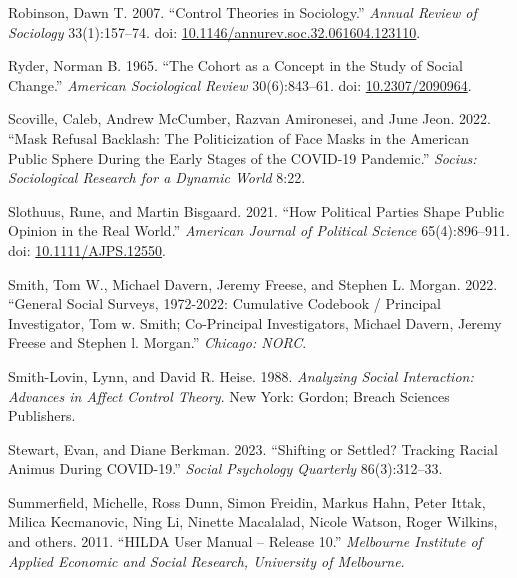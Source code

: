 \documentclass[
  12pt,
]{article}
\newlength{\cslhangindent}
\newlength{\cslentryspacingunit} %
\newenvironment{CSLReferences}[2] %
 {%
  \setlength{\parindent}{0pt}
  \ifodd #1
  \let\oldpar\par
  \def\par{\hangindent=\cslhangindent\oldpar}
  \fi
  \setlength{\parskip}{#2\cslentryspacingunit}
 }%
 {}
\begin{document}
\begin{CSLReferences}{1}{0}
\leavevmode{}%
Robinson, Dawn T. 2007. {``Control {Theories} in {Sociology}.''}
\emph{Annual Review of Sociology} 33(1):157--74. doi:
\href{https://doi.org/10.1146/annurev.soc.32.061604.123110}{10.1146/annurev.soc.32.061604.123110}.

\leavevmode{}%
Ryder, Norman B. 1965. {``The {Cohort} as a {Concept} in the {Study} of
{Social} {Change}.''} \emph{American Sociological Review} 30(6):843--61.
doi: \href{https://doi.org/10.2307/2090964}{10.2307/2090964}.

\leavevmode{}%
Scoville, Caleb, Andrew McCumber, Razvan Amironesei, and June Jeon.
2022. {``Mask {Refusal} {Backlash}: {The} {Politicization} of {Face}
{Masks} in the {American} {Public} {Sphere} During the {Early} {Stages}
of the {COVID}-19 {Pandemic}.''} \emph{Socius: Sociological Research for
a Dynamic World} 8:22.

\leavevmode{}%
Slothuus, Rune, and Martin Bisgaard. 2021. {``How {Political} {Parties}
{Shape} {Public} {Opinion} in the {Real} {World}.''} \emph{American
Journal of Political Science} 65(4):896--911. doi:
\href{https://doi.org/10.1111/AJPS.12550}{10.1111/AJPS.12550}.

\leavevmode{}%
Smith, Tom W., Michael Davern, Jeremy Freese, and Stephen L. Morgan.
2022. {``General Social Surveys, 1972-2022: Cumulative Codebook /
Principal Investigator, Tom w. Smith; Co-Principal Investigators,
Michael Davern, Jeremy Freese and Stephen l. Morgan.''} \emph{Chicago:
NORC}.

\leavevmode{}%
Smith-Lovin, Lynn, and David R. Heise. 1988. \emph{Analyzing {Social}
{Interaction}: {Advances} in {Affect} {Control} {Theory}}. New York:
Gordon; Breach Sciences Publishers.

\leavevmode{}%
Stewart, Evan, and Diane Berkman. 2023. {``Shifting or Settled? Tracking
Racial Animus During COVID-19.''} \emph{Social Psychology Quarterly}
86(3):312--33.

\leavevmode{}%
Summerfield, Michelle, Ross Dunn, Simon Freidin, Markus Hahn, Peter
Ittak, Milica Kecmanovic, Ning Li, Ninette Macalalad, Nicole Watson,
Roger Wilkins, and others. 2011. {``HILDA User Manual -- Release 10.''}
\emph{Melbourne Institute of Applied Economic and Social Research,
University of Melbourne}.


\end{CSLReferences}
\end{document}

